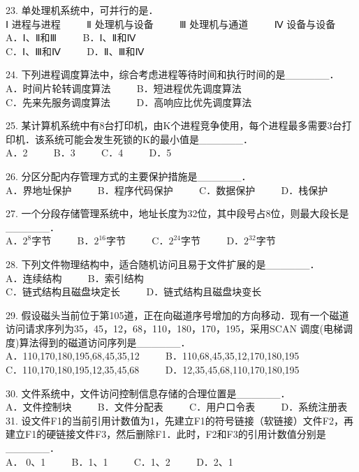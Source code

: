 23. 单处理机系统中，可并行的是． \\
Ⅰ 进程与进程 $\qquad$ Ⅱ 处理机与设备 $\qquad$ Ⅲ 处理机与通道  $\qquad$ Ⅳ 设备与设备 \\
A．Ⅰ、Ⅱ和Ⅲ $\qquad$ B．Ⅰ、Ⅱ和Ⅳ \\
C．Ⅰ、Ⅲ和Ⅳ $\qquad$ D．Ⅱ、Ⅲ和Ⅳ

24. 下列进程调度算法中，综合考虑进程等待时间和执行时间的是______． \\
A．时间片轮转调度算法 $\qquad$ B．短进程优先调度算法 \\
C．先来先服务调度算法 $\qquad$ D．高响应比优先调度算法

25. 某计算机系统中有8台打印机，由K个进程竞争使用，每个进程最多需要3台打印机．该系统可能会发生死锁的K的最小值是______． \\
A．2 $\qquad$ B．3 $\qquad$ C．4 $\qquad$ D．5

26. 分区分配内存管理方式的主要保护措施是______． \\
A．界地址保护 $\qquad$ B．程序代码保护 $\qquad$ C．数据保护 $\qquad$ D．栈保护

27. 一个分段存储管理系统中，地址长度为32位，其中段号占8位，则最大段长是______． \\
A．$2^8$字节 $\qquad$ B．$2^{16}$字节 $\qquad$ C．$2^{24}$字节 $\qquad$ D．$2^{32}$字节

28. 下列文件物理结构中，适合随机访问且易于文件扩展的是______． \\
A．连续结构 $\qquad$ B．索引结构 \\
C．链式结构且磁盘块定长 $\qquad$ D．链式结构且磁盘块变长

29. 假设磁头当前位于第105道，正在向磁道序号增加的方向移动．现有一个磁道访问请求序列为35，45，12，68，110，180，170，195，采用SCAN 调度(电梯调度)算法得到的磁道访问序列是______． \\
A．110,170,180,195,68,45,35,12 $\qquad$ B．110,68,45,35,12,170,180,195 \\
C．110,170,180,195,12,35,45,68 $\qquad$ D．12,35,45,68,110,170,180,195

30. 文件系统中，文件访问控制信息存储的合理位置是______． \\
A．文件控制块 $\qquad$ B．文件分配表 $\qquad$ C．用户口令表 $\qquad$ D．系统注册表 \\

31. 设文件F1的当前引用计数值为1，先建立F1的符号链接（软链接）文件F2，再建立F1的硬链接文件F3，然后删除F1．此时，F2和F3的引用计数值分别是______． \\
A． 0、1 $\qquad$ B．1、1 $\qquad$ C．1、2 $\qquad$ D．2、1


